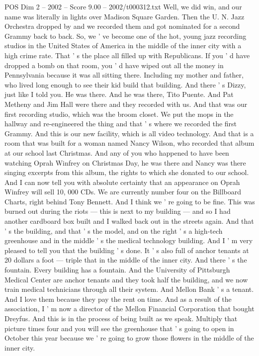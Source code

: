 \begin{textsample}{POS Dim 2 – 2002 – Score 9.00 – 2002/t000312.txt}
Well, we did win, and our name was literally in lights over Madison Square Garden.
Then the U.
N.
Jazz Orchestra dropped by and we recorded them and got nominated for a second Grammy back to back.
So, we ' ve become one of the hot, young jazz recording studios in the United States of America in the middle of the inner city with a high crime rate.
That ' s the place all filled up with Republicans.
If you ' d have dropped a bomb on that room, you ' d have wiped out all the money in Pennsylvania because it was all sitting there.
Including my mother and father, who lived long enough to see their kid build that building.
And there ' s Dizzy, just like I told you.
He was there.
And he was there, Tito Puente.
And Pat Metheny and Jim Hall were there and they recorded with us.
And that was our first recording studio, which was the broom closet.
We put the mops in the hallway and re-engineered the thing and that ' s where we recorded the first Grammy.
And this is our new facility, which is all video technology.
And that is a room that was built for a woman named Nancy Wilson, who recorded that album at our school last Christmas.
And any of you who happened to have been watching Oprah Winfrey on Christmas Day, he was there and Nancy was there singing excerpts from this album, the rights to which she donated to our school.
And I can now tell you with absolute certainty that an appearance on Oprah Winfrey will sell 10, 000 CDs.
We are currently number four on the Billboard Charts, right behind Tony Bennett.
And I think we ' re going to be fine.
This was burned out during the riots — this is next to my building — and so I had another cardboard box built and I walked back out in the streets again.
And that ' s the building, and that ' s the model, and on the right ' s a high-tech greenhouse and in the middle ' s the medical technology building.
And I ' m very pleased to tell you that the building ' s done.
It ' s also full of anchor tenants at 20 dollars a foot — triple that in the middle of the inner city.
And there ' s the fountain.
Every building has a fountain.
And the University of Pittsburgh Medical Center are anchor tenants and they took half the building, and we now train medical technicians through all their system.
And Mellon Bank ' s a tenant.
And I love them because they pay the rent on time.
And as a result of the association, I ' m now a director of the Mellon Financial Corporation that bought Dreyfus.
And this is in the process of being built as we speak.
Multiply that picture times four and you will see the greenhouse that ' s going to open in October this year because we ' re going to grow those flowers in the middle of the inner city.

\end{textsample}
